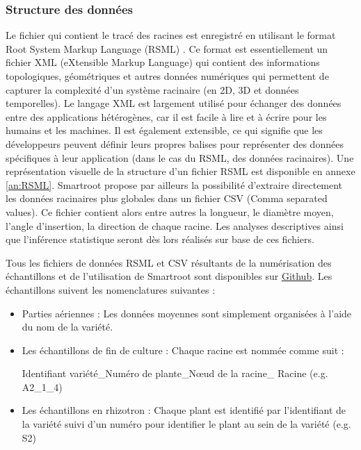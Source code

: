 \subsubsection{Structure des données}

Le fichier qui contient le tracé des racines est enregistré en utilisant le format Root System Markup Language (RSML) \citep{lobet_plant_2014}.
Ce format est essentiellement un fichier XML (eXtensible Markup Language) qui contient des informations topologiques, géométriques et autres données numériques qui permettent de capturer la complexité d'un système racinaire (en 2D, 3D et données temporelles).
Le langage XML est largement utilisé pour échanger des données entre des applications hétérogènes, car il est facile à lire et à écrire pour les humains et les machines. 
Il est également extensible, ce qui signifie que les développeurs peuvent définir leurs propres balises pour représenter des données spécifiques à leur application (dans le cas du RSML, des données racinaires).
Une représentation visuelle de la structure d'un fichier RSML est disponible en annexe \ref{an:RSML}.
Smartroot propose par ailleurs la possibilité d'extraire directement les données racinaires plus globales dans un fichier CSV (Comma separated values).
Ce fichier contient alors entre autres la longueur, le diamètre moyen, l'angle d'insertion, la direction de chaque racine.
Les analyses descriptives ainsi que l'inférence statistique seront dès lors réalisés sur base de ces fichiers.
\newline

Tous les fichiers de données RSML et CSV résultants de la numérisation des échantillons et de l'utilisation de Smartroot sont disponibles sur \href{https://github.com/ndegives/Memoire}{Github}.
Les échantillons suivent les nomenclatures suivantes :
\begin{itemize}
    \item Parties aériennes : Les données moyennes sont simplement organisées à l'aide du nom de la variété.
    \item Les échantillons de fin de culture : Chaque racine est nommée comme suit :
    \begin{center} Identifiant variété\_Numéro de plante\_N\oe ud de la racine\_ Racine (e.g. A2\_1\_4) \end{center}
    \item Les échantillons en rhizotron : Chaque plant est identifié par l'identifiant de la variété suivi d'un numéro pour identifier le plant au sein de la variété (e.g. S2)
\end{itemize}


